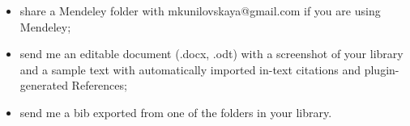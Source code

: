 \documentclass[a4paper,11pt]{article}
\begin{document}
\begin{tcolorbox}[width=\textwidth, colback={yellow!40!white}, title={}, colbacktitle=yellow!60!white, coltitle=black]
	\begin{itemize}
		\item share a Mendeley folder with mkunilovskaya@gmail.com if you are using Mendeley;
		\item send me an editable document (.docx, .odt) with a screenshot of your library and a sample text with automatically imported in-text citations and plugin-generated References;  
		\item send me a bib exported from one of the folders in your library.
	\end{itemize}
	
\end{tcolorbox}%
\end{document}
